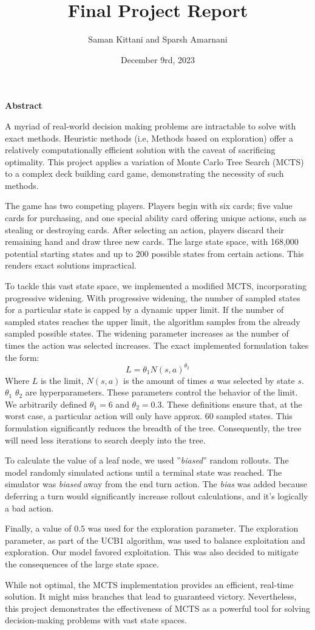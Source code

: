 \documentclass{article}
\title{Final Project Report}
\author{Saman Kittani and Sparsh Amarnani}
\date{December 9rd, 2023}
\begin{document}
	\maketitle
	\newpage
	\textbf{Abstract}
  
  A myriad of real-world decision making problems are intractable to solve with exact methods. Heuristic methods (i.e, Methods based on exploration) offer a relatively computationally efficient solution with the caveat of sacrificing optimality. This project applies a variation of Monte Carlo Tree Search (MCTS) to a complex deck building card game, demonstrating the necessity of such methods.
 
  The game has two competing players. Players begin with six cards; five value cards for purchasing, and one special ability card offering unique actions, such as stealing or destroying cards. After selecting an action, players discard their remaining hand and draw three new cards. The large state space, with 168,000 potential starting states and up to 200 possible states from certain actions. This renders exact solutions impractical.
  
  To tackle this vast state space, we implemented a modified MCTS, incorporating progressive widening. With progressive widening, the number of sampled states for a particular state is capped by a dynamic upper limit. If the number of sampled states reaches the upper limit, the algorithm samples from the already sampled possible states. The widening parameter increases as the number of times the action was selected increases. The exact implemented formulation takes the form:
  \begin{equation}
    L = \theta_1 N(s,a)^{\theta_2}
  \end{equation}
  Where $L$ is the limit, $N(s,a)$ is the amount of times $a$ was selected by state $s$. $\theta_1$ $\theta_2$ are hyperparameters. These parameters control the behavior of the limit. We arbitrarily defined $\theta_1 = 6$ and $\theta_2 = 0.3$. 
  These definitions ensure that, at the worst case, a particular action will only have approx. 60 sampled states. This formulation significantly reduces the breadth of the tree. Consequently, the tree will need less iterations to search deeply into the tree.

  To calculate the value of a leaf node, we used ''\emph{biased}'' random rollouts. The model randomly simulated actions until a terminal state was reached. The simulator was \emph{biased} away from the end turn action. The \emph{bias} was added because deferring a turn would significantly increase rollout calculations, and it's logically a bad action. 
  
  Finally, a value of $0.5$ was used for the exploration parameter. The exploration parameter, as part of the UCB1 algorithm, was used to balance exploitation and exploration. Our model favored exploitation. This was also decided to mitigate the consequences of the large state space. 

  While not optimal, the MCTS implementation provides an efficient, real-time solution. It might miss branches that lead to guaranteed victory. Nevertheless, this project demonstrates the effectiveness of MCTS as a powerful tool for solving decision-making problems with vast state spaces.
\end{document}
